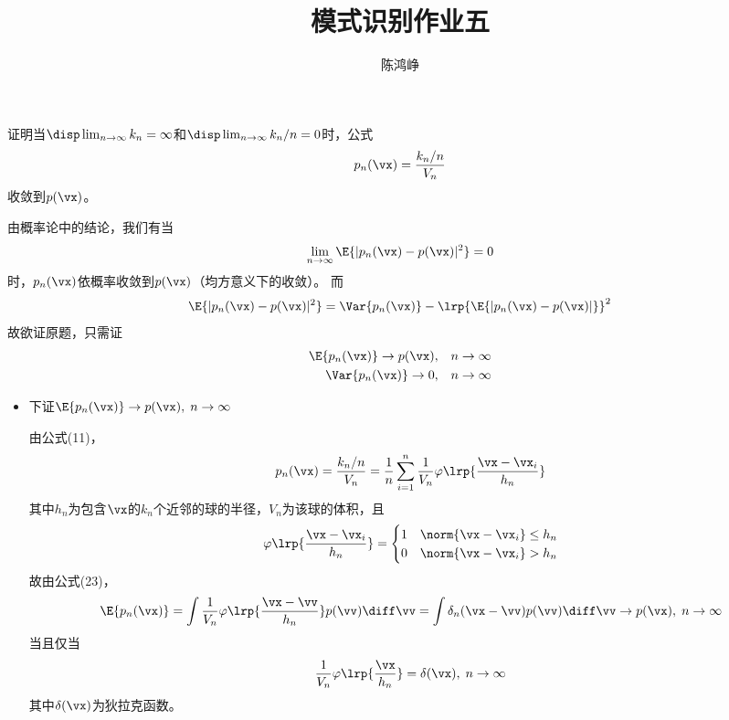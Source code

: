 \documentclass[reportComp]{thesis}
\title{模式识别作业五}
\author{陈鸿峥}
\begin{document}
\maketitle

\begin{question}[\textsection 4 Q5]
证明当$\disp\lim_{n\to\infty}k_n=\infty$和$\disp\lim_{n\to\infty}k_n/n=0$时，公式
\[p_n(\vx)=\frac{k_n/n}{V_n}\]
收敛到$p(\vx)$。
\end{question}
\begin{answer}
由概率论中的结论，我们有当
\[\lim_{n\to \infty}\E{|p_n(\vx)-p(\vx)|^2}=0\]
时，$p_n(\vx)$依概率收敛到$p(\vx)$（均方意义下的收敛）。
而
\[\E{|p_n(\vx)-p(\vx)|^2}=\Var{p_n(\vx)}-\lrp{\E{|p_n(\vx)-p(\vx)|}}^2\]
故欲证原题，只需证
\[\begin{aligned}
\E{p_n(\vx)}\to p(\vx), & \quad n\to\infty\\
\Var{p_n(\vx)}\to 0, & \quad n\to\infty
\end{aligned}\]

\begin{itemize}
	\item 下证$\E{p_n(\vx)}\to p(\vx),\;n\to\infty$\par
由公式(11)，
\[p_n(\vx)=\frac{k_n/n}{V_n}=\frac{1}{n}\sum_{i=1}^n\frac{1}{V_n}\varphi\lrp{\frac{\vx-\vx_i}{h_n}}\]
其中$h_n$为包含$\vx$的$k_n$个近邻的球的半径，$V_n$为该球的体积，且
\[\varphi\lrp{\frac{\vx-\vx_i}{h_n}}=\begin{cases}
1 & \norm{\vx-\vx_i}\leq h_n\\
0 & \norm{\vx-\vx_i}>h_n
\end{cases}\]
故由公式(23)，
\[\E{p_n(\vx)}=\int\frac{1}{V_n}\varphi\lrp{\frac{\vx-\vv}{h_n}}p(\vv)\diff\vv
=\int\delta_n(\vx-\vv)p(\vv)\diff\vv\to p(\vx),\;n\to\infty\]
当且仅当
\[\frac{1}{V_n}\varphi\lrp{\frac{\vx}{h_n}}=\delta(\vx),\;n\to\infty\]
其中$\delta(\vx)$为狄拉克函数。


\end{itemize}
\end{answer}
\end{document}
